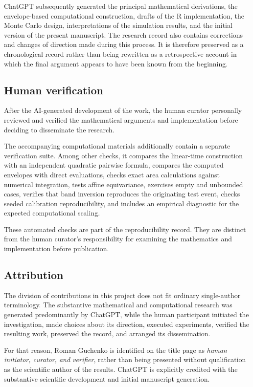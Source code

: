\documentclass[11pt]{article}
\begin{document}
ChatGPT subsequently generated the principal mathematical derivations,
the envelope-based computational construction, drafts of the R
implementation, the Monte Carlo design, interpretations of the
simulation results, and the initial version of the present manuscript.
The research record also contains corrections and changes of direction
made during this process.  It is therefore preserved as a chronological
record rather than being rewritten as a retrospective account in which
the final argument appears to have been known from the beginning.

\subsection*{Human verification}

After the AI-generated development of the work, the human curator
personally reviewed and verified the mathematical arguments and
implementation before deciding to disseminate the research.

The accompanying computational materials additionally contain a
separate verification suite.  Among other checks, it compares the
linear-time construction with an independent quadratic pairwise
formula, compares the computed envelopes with direct evaluations,
checks exact area calculations against numerical integration, tests
affine equivariance, exercises empty and unbounded cases, verifies that
band inversion reproduces the originating test event, checks seeded
calibration reproducibility, and includes an empirical diagnostic for
the expected computational scaling.

These automated checks are part of the reproducibility record.  They
are distinct from the human curator's responsibility for examining the
mathematics and implementation before publication.

\subsection*{Attribution}

The division of contributions in this project does not fit ordinary
single-author terminology.  The substantive mathematical and
computational research was generated predominantly by ChatGPT, while
the human participant initiated the investigation, made choices about
its direction, executed experiments, verified the resulting work,
preserved the record, and arranged its dissemination.

For that reason, Roman Guchenko is identified on the title page as
\emph{human initiator, curator, and verifier}, rather than being
presented without qualification as the scientific author of the
results.  ChatGPT is explicitly credited with the substantive
scientific development and initial manuscript generation.
\end{document}
